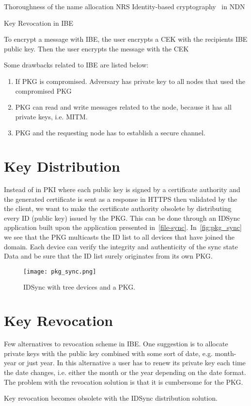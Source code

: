 
Thoroughness of the name allocation \gls{NRS} 
Identity-based cryptography~\cite{DBLP:conf/icnp/ZhangCXWSW11} in \gls{NDN}

Key Revocation in IBE ~\cite{DBLP:journals/iacr/BoldyrevaGK12} 

To encrypt a message with \gls{IBE}, the user encrypts a \gls{CEK} with the recipients \gls{IBE} public key.
Then the user encrypts the message with the \gls{CEK}~\cite[section 2.2.2]{rfc5408}

Some drawbacks related to \gls{IBE} are listed below:
\begin{enumerate}
	\item If \gls{PKG} is compromised. Adversary has private key to all nodes that used the compromised \gls{PKG}
	\item \gls{PKG} can read and write messages related to the node, because it has all private keys, i.e. \gls{MITM}.
	\item \gls{PKG} and the requesting node has to establish a secure channel. 
\end{enumerate}

\section{Key Distribution}
Instead of in \gls{PKI} where each public key is signed by a certificate authority and the generated certificate is sent as a response in \gls{HTTPS} then validated by the the client, we want to make the certificate authority obsolete by distributing every \gls{ID} (public key) issued by the \gls{PKG}.
This can be done through an IDSync application built upon the application presented in~\autoref{file-sync}.
In~\autoref{fig:pkg_sync} we see that the \gls{PKG} multicasts the \gls{ID} list to all devices that have joined the domain.
Each device can verify the integrity and authenticity of the sync state Data and be sure that the \gls{ID} list surely originates from its own \gls{PKG}.
\begin{figure}[H]
  \centering
  \texttt{[image: pkg\_sync.png]}
  \caption{IDSync with tree devices and a \gls{PKG}.}
  \label{fig:pkg_sync}
\end{figure}

\section{Key Revocation}
Few alternatives to revocation scheme in \gls{IBE}.
One suggestion is to allocate private keys with the public key combined with some sort of date, e.g. month-year or just year. 
In this alternative a user has to renew its private key each time the date changes, i.e. either the month or the year depending on the date format.
The problem with the revocation solution is that it is cumbersome for the \gls{PKG}.


Key revocation becomes obsolete with the IDSync distribution solution. 
